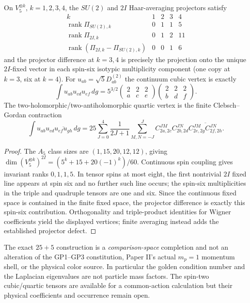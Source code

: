 \documentclass[11pt]{article}
\begin{document}
\begin{theorem}
\label{p1:thm:v349-twisted25-vertex-defect}
On $V_5^{\otimes k}$, $k=1,2,3,4$, the $SU(2)$ and $2I$
Haar-averaging projectors satisfy
\[
 \begin{array}{c|rrrr}k&1&2&3&4\\\hline
 \operatorname{rank}\Pi_{SU(2),k}&0&1&1&5\\
 \operatorname{rank}\Pi_{2I,k}&0&1&2&11\\
 \operatorname{rank}(\Pi_{2I,k}-\Pi_{SU(2),k})&0&0&1&6
 \end{array}
\]
and the projector difference at $k=3,4$ is precisely the
projection onto the unique $2I$-fixed vector in each spin-six
isotypic multiplicity component (one copy at $k=3$, six at
$k=4$).  For $u_{ab}=\sqrt5D^{(2)}_{ab}$ the continuum cubic
vertex is exactly
\[
 \int u_{ab}u_{cd}u_{ef}\,dg=5^{3/2}
 \begin{pmatrix}2&2&2\\a&c&e\end{pmatrix}
 \begin{pmatrix}2&2&2\\b&d&f\end{pmatrix}.
\]
The two-holomorphic/two-antiholomorphic quartic vertex is the
finite Clebsch--Gordan contraction
\[
 \int u_{ab}u_{cd}\overline{u_{ef}u_{gh}}\,dg=
 25\sum_{J=0}^4\frac1{2J+1}\sum_{M,N=-J}^J
 C^{JM}_{2a,2c}C^{JN}_{2b,2d}
 \overline{C^{JM}_{2e,2g}C^{JN}_{2f,2h}}.
\]
\end{theorem}
\begin{proof}
The $A_5$ class sizes are $(1,15,20,12,12)$, giving
$\dim(V_5^{\otimes k})^{2I}=(5^k+15+20(-1)^k)/60$.
Continuous spin coupling gives invariant ranks $0,1,1,5$.
In tensor spins at most eight, the first nontrivial $2I$ fixed
line appears at spin six and no further such line occurs;
the spin-six multiplicities in the triple and quadruple tensors
are one and six.  Since the continuous fixed space is contained
in the finite fixed space, the projector difference is exactly
this spin-six contribution.  Orthogonality and triple-product
identities for Wigner coefficients yield the displayed vertices;
finite averaging instead adds the established projector defect.
\end{proof}

\begin{remark}
\label{p1:rem:v349-mathematical-physical-boundary}
The exact $25+5$ construction is a \emph{comparison-space}
completion and not an alteration of the GP1--GP3 constitution,
Paper II's actual $m_p=1$ momentum shell, or the physical color
source.  In particular the golden condition number and the
Laplacian eigenvalues are not particle mass factors.  The
spin-two cubic/quartic tensors are available for a common-action
calculation but their physical coefficients and occurrence remain
open.
\end{remark}
\end{document}
